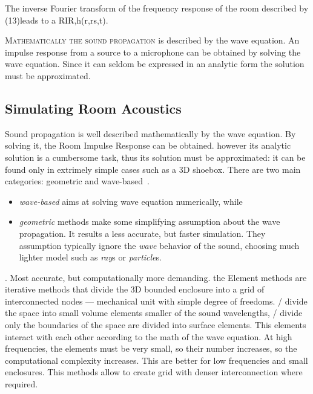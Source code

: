 The inverse Fourier transform of the frequency response of the room described by (13)leads to a RIR,h(r,rs,t).

\textsc{Mathematically the sound propagation} is described by the wave equation.
An impulse response from a source to a microphone can be obtained by solving the wave equation.
Since it can seldom be expressed in an analytic form the solution must be approximated.

\subsection{Simulating Room Acoustics}
Sound propagation is well described mathematically by the wave equation.
By solving it, the Room Impulse Response can be obtained.
however its analytic solution is a cumbersome task, thus its solution must be approximated: it can be found only in extrimely
simple cases such as a 3D shoebox.
There are two main categories: geometric and wave-based~\cite{habets2010generator, reuk.github.io, Savioja2015goemetric}.
\begin{itemize}
    \item \textit{wave-based} aims at solving wave equation numerically, while
    \item \textit{geometric} methods make some simplifying assumption about the wave propagation.
    It results a less accurate, but faster simulation.
    They assumption typically ignore the \textit{wave} behavior of the sound, choosing much lighter model such as \textit{ray}s or \textit{particle}s.
\end{itemize}

.
Most accurate, but computationally more demanding.
the Element methods are iterative methods that divide the 3D bounded enclosure into a grid of interconnected nodes --- mechanical unit with simple degree of freedoms.
\FEMf/ divide the space into small volume elements smaller of the sound wavelengths,
\BEMf/ divide only the boundaries of the space are divided into surface elements.
This elements interact with each other according to the math of the wave equation.
At high frequencies, the elements must be very small, so their number increases, so the computational complexity increases.
This are better for low frequencies and small enclosures.
This methods allow to create grid with denser interconnection where required.


